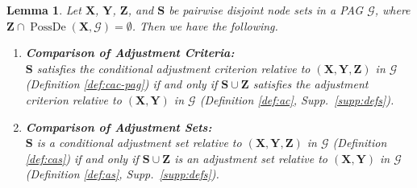 \documentclass[twoside]{article}
\newtheorem{lemma}[theorem]{Lemma}
\DeclareMathOperator{\PossDe}{PossDe}
\newcommand{\mb}[1]{\mathbf{#1}}
\newcommand{\g}[1][G]{\mathcal{#1}}
\begin{document}

\begin{lemma}
\label{lem:comparison-pag}
    Let $\mb{X}$, $\mb{Y}$, $\mb{Z}$, and $\mb{S}$ be pairwise disjoint node sets in a PAG $\g$, where $\mb{Z} \cap \PossDe(\mb{X}, \g) = \emptyset$. Then we have the following.
    \begin{enumerate}[label=\emph{(\alph*)}]
        \item \textbf{Comparison of Adjustment Criteria:}\\
        $\mb{S}$ satisfies the conditional adjustment criterion relative to $(\mb{X,Y,Z})$ in $\g$ (Definition \ref{def:cac-pag}) if and only if $\mb{S} \cup \mb{Z}$ satisfies the adjustment criterion relative to $(\mb{X}, \mb{Y})$ in $\g$ (Definition \ref{def:ac}, Supp.\ \ref{supp:defs}). \label{lem:comparison-pag-a}
        \item \textbf{Comparison of Adjustment Sets:}\\
        $\mb{S}$ is a conditional adjustment set relative to $(\mb{X,Y,Z})$ in $\g$ (Definition \ref{def:cas}) if and only if $\mb{S} \cup \mb{Z}$ is an adjustment set relative to $(\mb{X}, \mb{Y})$ in $\g$ (Definition \ref{def:as}, Supp.\ \ref{supp:defs}). \label{lem:comparison-pag-b}
    \end{enumerate}
\end{lemma}
\end{document}

